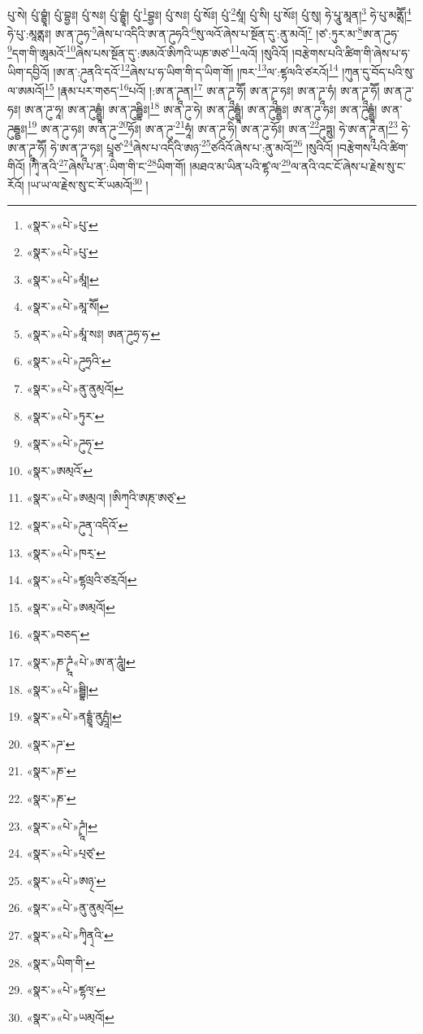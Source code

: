 པུ་སེ། པུཾ་བྷྱཱཾ། པུཾ་བྷྱཿ། པུཾ་སཿ། པུཾ་བྷྱཱཾ། པུཾ་\footnote{«སྣར་»«པེ་»པུ་}བྷྱཿ། པུཾ་སཿ། པུཾ་སོཿ། པུཾ་\footnote{«སྣར་»«པེ་»པུ་}སཱཾ། པུཾ་སི། པུ་སོཿ། པུཾ་སུ། ཧེ་པཱུ་མཱན།\footnote{«སྣར་»«པེ་»མཱཾ།} ཧེ་པུ་མནྶཽ།\footnote{«སྣར་»«པེ་»མཱ་སཽ།} ཧེ་པུ་:མཱནྶཿ། ཨ་ན་ཌུཧ་\footnote{«སྣར་»«པེ་»མཱཾ་སཿ། ཨན་ཌུཧྲ་ཧ་}ཞེས་པ་འདིའི་ཨ་ན་ཌུཧའི་\footnote{«སྣར་»«པེ་»ཌུཧྲའི་}སུ་ལའོ་ཞེས་པ་སྔོན་དུ་:ནུ་མའོ།\footnote{«སྣར་»«པེ་»ནུ་ནུམ྄འོ།} །ཙ་:ཏུར་མ་\footnote{«སྣར་»«པེ་»ཏུར་}ཨ་ན་ཌུཧ་\footnote{«སྣར་»«པེ་»ཌུཧ྄་}དག་གི་ཨཱམའོ་\footnote{«སྣར་»ཨམ྄འོ་}ཞེས་པས་སྔོན་དུ་:ཨམའོ་ཨིཀའི་ཡཎ་ཨཙ་\footnote{«སྣར་»«པེ་»ཨམྲའ། །ཨིཀ྄འི་ཨཎ྄་ཨཙ྄་}ལའོ། །སུའིའོ། །བརྩེགས་པའི་ཚིག་གི་ཞེས་པ་ཧ་ཡིག་དབྱིའོ། །ཨ་ན་:ཌུནའི་དའོ་\footnote{«སྣར་»«པེ་»ཌུན྄་འདིའོ་}ཞེས་པ་ཧ་ཡིག་གི་ད་ཡིག་གོ། །ཁར་\footnote{«སྣར་»«པེ་»ཁར྄་}ལ་:ཛྷལའི་ཙརའོ།\footnote{«སྣར་»«པེ་»ཛྷལྲའི་ཙརྲའོ།} །ཀུན་དུ་བོད་པའི་སུ་ལ་ཨམའོ།\footnote{«སྣར་»«པེ་»ཨམ྄འོ།} །རྣམ་པར་གཅད་\footnote{«སྣར་»བཅད་}པའོ། །:ཨ་ན་ཌྭཱན།\footnote{«སྣར་»ཎ་ཌྭཱཾ«པེ་»ཨ་ན་ཌཱུཾ།} ཨ་ན་ཌྭཱ་ཧཽ། ཨ་ན་ཌྭཱ་ཧཿ། ཨ་ན་ཌྭཱ་ཧཾ། ཨ་ན་ཌྭཱ་ཧཽ། ཨ་ན་ཌུ་ཧཿ། ཨ་ན་ཌུ་ཧཱ། ཨ་ན་ཌུདྦྷྱཱཾ། ཨ་ན་ཌུདྦྷིཿ།\footnote{«སྣར་»«པེ་»བྦྷི།} ཨ་ན་ཌུ་ཧེ། ཨ་ན་ཌུདྦྷྱཱཾ། ཨ་ན་ཌུདྦྷྱཿ། ཨ་ན་ཌུ་ཧཿ། ཨ་ན་ཌུདྦྷྱཱཾ། ཨ་ན་ཌུདྦྷྱཿ།\footnote{«སྣར་»«པེ་»ནདྷྱཱཾ་ནུདྤཱཾ།} ཨ་ན་ཌུ་ཧཿ། ཨ་ན་ཌུ་\footnote{«སྣར་»ཌ་}ཧོཿ། ཨ་ན་ཌུ་\footnote{«སྣར་»ཎ་}ཧཱཾ། ཨ་ན་ཌུ་ཧི། ཨ་ན་ཌུ་ཧོཿ། ཨ་ན་\footnote{«སྣར་»ཎ་}ཌུཏྶུ། ཧེ་ཨ་ན་ཌྭཱ་ན།\footnote{«སྣར་»«པེ་»ཌྭཱཾ།} ཧེ་ཨ་ན་ཌྭཱ་ཧཽ། ཧེ་ཨ་ན་ཌྭཱ་ཧཿ། པྲཱཙ་\footnote{«སྣར་»«པེ་»པ྄ཙ྄་}ཞེས་པ་འདིའི་ཨཉ་\footnote{«སྣར་»«པེ་»ཨཉ྄་}ཙའིའོ་ཞེས་པ་:ནུ་མའོ།\footnote{«སྣར་»«པེ་»ནུ་ནུམ྄འོ།} །སུའིའོ། །བརྩེགས་པའི་ཚིག་གིའོ། །ཀྭི་ནའི་\footnote{«སྣར་»«པེ་»ཀྭིན྄འི་}ཞེས་པ་ན་:ཡིག་གི་ང་\footnote{«སྣར་»ཡིག་གི་}ཡིག་གོ། །མཐའ་མ་ཡིན་པའི་ཛྷ་ལ་\footnote{«སྣར་»«པེ་»ཛྷལ྄་}ལ་ནའི་འང་ངོ་ཞེས་པ་རྗེས་སུ་ང་རོའོ། །ཡ་ཡ་ལ་རྗེས་སུ་ང་རོ་ཡམའོ།\footnote{«སྣར་»«པེ་»ཡམ྄འོ།} །
